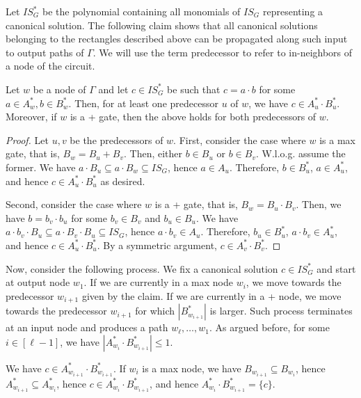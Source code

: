Let $IS_G^*$ be the polynomial containing all monomials of $IS_G$ representing a canonical solution. The following claim shows that all canonical solutions belonging to the rectangles described above can be propagated along such input to output paths of $\Gamma$. We will use the term predecessor to refer to in-neighbors of a node of the circuit.

\begin{claim}
	Let $w$ be a node of $\Gamma$ and let $c \in IS_G^*$ be such that $c = a \cdot b$ for some $a \in A_w^*, b \in B_w^*$.
	Then, for at least one predecessor $u$ of $w$, we have $c \in A_u^* \cdot B_u^*$.
	Moreover, if $w$ is a + gate, then the above holds for both predecessors of $w$.
\end{claim}

\begin{proof}
	Let $u, v$ be the predecessors of $w$.
	First, consider the case where $w$ is a max gate, that is, $B_w = B_u + B_v$. Then, either $b \in B_u$ or $b \in B_v$. W.l.o.g. assume the former.
    We have $a \cdot B_u \subseteq a \cdot B_w \subseteq IS_G$, hence $a \in A_u$. Therefore, $b \in B_u^*$, $a \in A_u^*$, and hence $c \in A_u^* \cdot B_u^*$ as desired.
    
	Second, consider the case where $w$ is a + gate, that is, $B_w = B_u \cdot B_v$. Then, we have $b = b_v \cdot b_u$ for some $b_v \in B_v$ and $b_u \in B_u$.
    We have $a \cdot b_v \cdot B_u \subseteq a \cdot B_v \cdot B_u \subseteq IS_G$, hence $a \cdot b_v \in A_u$. Therefore, $b_u \in B_u^*$, $a \cdot b_v \in A_u^*$, and hence $c \in A_u^* \cdot B_u^*$. By a symmetric argument, $c \in A_v^* \cdot B_v^*$.
\end{proof}


Now, consider the following process. We fix a canonical solution $c \in IS_G^*$ and start at output node $w_1$. If we are currently in a max node $w_i$, we move towards the predecessor $w_{i+1}$ given by the claim. If we are currently in a + node, we move towards the predecessor $w_{i+1}$ for which $|B_{w_{i+1}}^*|$ is larger. Such process terminates at an input node and produces a path $w_\ell, \dots, w_1$. As argued before, for some $i \in [\ell - 1]$, we have $|A_{w_i}^* \cdot B_{w_{i+1}}^*| \leq 1$.

We have $c \in A_{w_{i+1}}^* \cdot B_{w_{i+1}}^*$. If $w_i$ is a max node, we have $B_{w_{i+1}} \subseteq B_{w_i}$, hence $A_{w_{i+1}}^* \subseteq A_{w_i}^*$, hence $c \in A_{w_i}^* \cdot B_{w_{i+1}}^*$, and hence $A_{w_i}^* \cdot B_{w_{i+1}}^* = \{c\}$.


